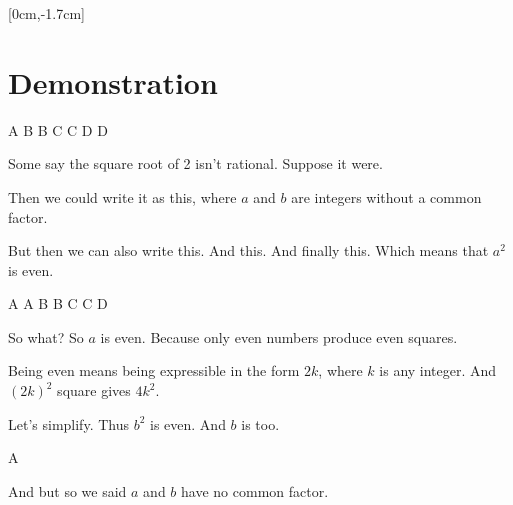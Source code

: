 


\titleslide

\Title
{}[0cm,-1.7cm]{\it{}}
\Author
{}\Date

\endtitleslide





\section{Demonstration}


 A B
 B C
 C D
 D {}

\step Some say the square root of 2 isn't rational.
\step Suppose it were.

\step[A] Then we could write it as this, where $a$ and $b$ are
integers without a common factor.

\step[B] But then we can also write this.
\step[C] And this.
\step[D] And finally this.
\step Which means that $a^2$ is even.

\endslide




   A  
 A B
 B C
 C D

\step[visible="true"] So what?
\step So $a$ is even. Because only even numbers produce even squares.

\step[A] Being even means being expressible in the form $2k$, where $k$ is
any integer.
\step[B] And $(2k)^2$ square gives $4k^2$.

\step[C] Let's simplify.
\step Thus $b^2$ is even.
\step And $b$ is too.

\endslide




 A {}

\step[visible=true] And but so we said $a$ and $b$ have no common factor.

